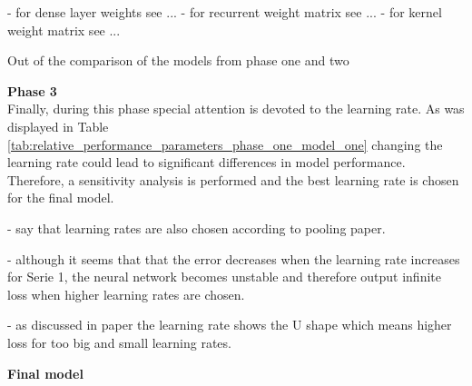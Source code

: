 - for dense layer weights see ...
- for recurrent weight matrix see ...
- for kernel weight matrix see ...

Out of the comparison of the models from phase one and two

\textbf{Phase 3}\\
Finally, during this phase special attention is devoted to the learning rate. As was displayed in Table \ref{tab:relative_performance_parameters_phase_one_model_one} changing the learning rate could lead to significant differences in model performance. Therefore, a sensitivity analysis is performed and the best learning rate is chosen for the final model. 

- say that learning rates are also chosen according to pooling paper. 

- although it seems that that the error decreases when the learning rate increases for Serie 1, the neural network becomes unstable and therefore output infinite loss when higher learning rates are chosen.

- as discussed in paper \cite{Greff2017} the learning rate shows the U shape which means higher loss for too big and small learning rates. 



\textbf{Final model}\\

